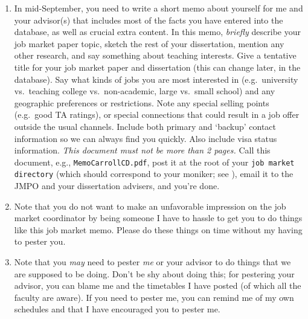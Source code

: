 \documentclass{\classes/econtex}
\begin{document}
\begin{enumerate}
  \hypertarget{write-and-post-memo}{}
\item {} In mid-September, you need to write a short memo about yourself for me and your advisor(s) that includes most of the facts you have entered into the database, as well as crucial extra content.  In this memo, \textit{briefly} describe your job market paper topic, sketch the rest of your dissertation, mention any other research, and say something about teaching interests.  Give a tentative title for your job market paper and dissertation (this can change later, in the database).  Say what kinds of jobs you are most interested in (e.g.\ university vs.\ teaching college vs.\ non-academic, large vs.\ small school) and any geographic preferences or restrictions.  Note any special selling points (e.g.\ good TA ratings), or special connections that could result in a job offer outside the usual channels.  Include both primary and `backup' contact information so we can always find you quickly.  Also include visa status information.  \textit{This document must not be more than 2 pages.}  Call this document, e.g., \texttt{MemoCarrollCD.pdf}, post it at the root of your \texttt{job market directory} (which should correspond to your moniker; see \ntn), email it to the JMPO and your dissertation advisers, and you're done.  

\item Note that you do not want to make an unfavorable impression on
  the job market coordinator by being someone I have to hassle to get
  you to do things like this job market memo.  Please do these things
  on time without my having to pester you.

  \hypertarget{Pester}{}
\item Note that you \textit{may} need to pester \textit{me} or your advisor to do things
  that we are supposed to be doing.  Don't be shy about doing this; for pestering
  your advisor, you can blame me and the timetables I have posted (of which all the
  faculty are aware).  If you need to pester me, you can remind me of my own
  schedules and that I have encouraged you to pester me.


\end{enumerate}
\end{document}
